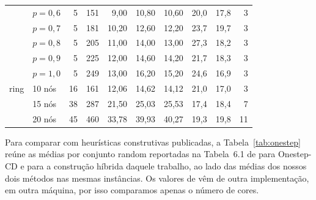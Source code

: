 \documentclass[12pt]{article}
\begin{document}
\begin{table}[ht]
\begin{tabular}{llrrrrrrrr}
           & $p=0{,}6$ & 5 & 151 & 9,00  & 10,80 & 10,60 & 20,0 & 17,8 & 3 \\
           & $p=0{,}7$ & 5 & 181 & 10,20 & 12,60 & 12,20 & 23,7 & 19,7 & 3 \\
           & $p=0{,}8$ & 5 & 205 & 11,00 & 14,00 & 13,00 & 27,3 & 18,2 & 3 \\
           & $p=0{,}9$ & 5 & 225 & 12,00 & 14,60 & 14,20 & 21,7 & 18,3 & 3 \\
           & $p=1{,}0$ & 5 & 249 & 13,00 & 16,20 & 15,20 & 24,6 & 16,9 & 3 \\
    \midrule
    ring   & 10 nós & 16 & 161 & 12,06 & 14,62 & 14,12 & 21,0 & 17,0 & 3 \\
           & 15 nós & 38 & 287 & 21,50 & 25,03 & 25,53 & 17,4 & 18,4 & 7 \\
           & 20 nós & 45 & 460 & 33,78 & 39,93 & 40,27 & 19,3 & 19,8 & 11 \\
    \bottomrule
  \end{tabular}
\end{table}

Para comparar com heurísticas construtivas publicadas, a
Tabela~\ref{tab:onestep} reúne as médias por conjunto random reportadas na Tabela~6.1 de
\cite{fritz2013} para Onestep-CD \cite{li2000} e para a construção híbrida
daquele trabalho, ao lado das médias dos nossos dois métodos nas mesmas
instâncias. Os valores de \cite{fritz2013} vêm de outra implementação, em outra
máquina, por isso comparamos apenas o número de cores.
\end{document}
